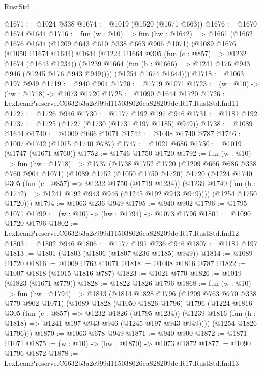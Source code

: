 \begin{lexlean}{RustStd}
\begin{coremodule}
@1671 := @1024 @338
@1674 := @1019 (@1520 (@1671 @663))
@1676 := @1670 @1674 @1644
@1716 := fun (w : @10) =>
  fun (hw : @1642) =>
  @1661
    (@1662
      @1676
      @1644
      (@1209 @643 @610 @338 @663 @906 @1071)
      (@1089
        @1676
        (@1050 @1674 @1644)
        @1644
        (@1224
          @1664
          @305
          (fun (c : @857) => @1232 @1674 (@1643 @1234))
          (@1239 @1664 (fun (h : @1666) => @1241 @176 @943 @946 (@1245 @176 @943 @949))))
        (@1254 @1674 @1644)))
@1718 := @1063 @197 @949
@1719 := @940 @904
@1720 := @1719 @1071
@1723 := (w : @10) -> (hw : @1718) -> @1073 @1720
@1725 := @1090 @1644 @1720
@1726 := LexLeanPreserve.C6632b3a2e999d115038026ca828209de.R17.RustStd.fnd11
@1727 := @1726 @946
@1730 := @1177 @192 @197 @946
@1731 := @1181 @192
@1737 := @1725 (@1727 (@1730 (@1731 @197 @1185) @949))
@1738 := @1089 @1644
@1740 := @1009 @666 @1071
@1742 := @1008 @1740 @787
@1746 := @1007 @1742 (@1015 @1740 @787)
@1747 := @1021 @686
@1750 := @1019 (@1747 (@1671 @760))
@1752 := @1746 @1750 @1720
@1792 := fun (w : @10) =>
  fun (hw : @1718) =>
  @1737
    (@1738
      @1752
      @1720
      (@1209 @666 @686 @338 @760 @904 @1071)
      (@1089
        @1752
        (@1050 @1750 @1720)
        @1720
        (@1224
          @1740
          @305
          (fun (c : @857) => @1232 @1750 (@1719 @1234))
          (@1239 @1740 (fun (h : @1742) => @1241 @192 @943 @946 (@1245 @192 @943 @949))))
        (@1254 @1750 @1720)))
@1794 := @1063 @236 @949
@1795 := @940 @902
@1796 := @1795 @1071
@1799 := (w : @10) -> (hw : @1794) -> @1073 @1796
@1801 := @1090 @1720 @1796
@1802 := LexLeanPreserve.C6632b3a2e999d115038026ca828209de.R17.RustStd.fnd12
@1803 := @1802 @946
@1806 := @1177 @197 @236 @946
@1807 := @1181 @197
@1813 := @1801 (@1803 (@1806 (@1807 @236 @1185) @949))
@1814 := @1089 @1720
@1816 := @1009 @763 @1071
@1818 := @1008 @1816 @787
@1822 := @1007 @1818 (@1015 @1816 @787)
@1823 := @1021 @770
@1826 := @1019 (@1823 (@1671 @779))
@1828 := @1822 @1826 @1796
@1868 := fun (w : @10) =>
  fun (hw : @1794) =>
  @1813
    (@1814
      @1828
      @1796
      (@1209 @763 @770 @338 @779 @902 @1071)
      (@1089
        @1828
        (@1050 @1826 @1796)
        @1796
        (@1224
          @1816
          @305
          (fun (c : @857) => @1232 @1826 (@1795 @1234))
          (@1239 @1816 (fun (h : @1818) => @1241 @197 @943 @946 (@1245 @197 @943 @949))))
        (@1254 @1826 @1796)))
@1870 := @1063 @678 @949
@1871 := @940 @900
@1872 := @1871 @1071
@1875 := (w : @10) -> (hw : @1870) -> @1073 @1872
@1877 := @1090 @1796 @1872
@1878 := LexLeanPreserve.C6632b3a2e999d115038026ca828209de.R17.RustStd.fnd13

\end{coremodule}
\end{lexlean}

